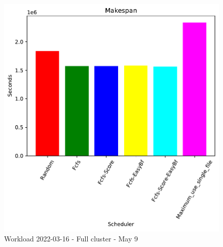 \documentclass[a4paper]{article}
\begin{document}
\begin{figure}[H]
	\begin{minipage}[b]{0.5\linewidth}\centering\includegraphics[width=1\linewidth]{MBSS/plot/2022-03-16_Makespan450_128_32_256_4_1024.pdf}\caption{Makespan}\vspace{4ex}\end{minipage}\caption{Workload 2022-03-16 - Full cluster - May 9}\end{figure}
\end{document}
